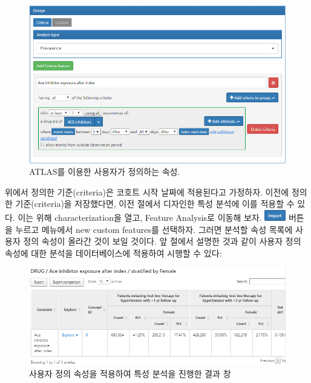 \documentclass[11pt]{book}
\theoremstyle{definition}
\theoremstyle{definition}
\theoremstyle{definition}
\theoremstyle{remark}
\begin{document}
\begin{figure}

{\centering \includegraphics[width=1\linewidth]{images/Characterization/atlasCharacterizationCustomFeature} 

}

\caption{ATLAS를 이용한 사용자가 정의하는 속성.}\label{fig:atlasCharacterizationCustomFeature}
\end{figure}

위에서 정의한 기준(criteria)은 코호트 시작 날짜에 적용된다고 가정하자.
이전에 정의한 기준(criteria)을 저장했다면, 이전 절에서 디자인한 특성
분석에 이를 적용할 수 있다. 이는 위해 characterization을 열고, Feature
Analysis로 이동해 보자.
\includegraphics{images/Characterization/atlasImportButton.png} 버튼을
누르고 메뉴에서 new custom features를 선택하자. 그러면 분석할 속성
목록에 사용자 정의 속성이 올라간 것이 보일 것이다. 앞 절에서 설명한 것과
같이 사용자 정의 속성에 대한 분석을 데이터베이스에 적용하여 시행할 수
있다:

\begin{figure}

{\centering \includegraphics[width=1\linewidth]{images/Characterization/atlasCharacterizationCustomFeatureResults} 

}

\caption{사용자 정의 속성을 적용하여 특성 분석을 진행한 결과 창}\label{fig:atlasCharacterizationCustomFeatureResults}
\end{figure}
\end{document}
